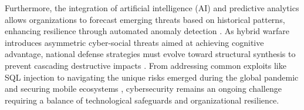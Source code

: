 \documentclass[11pt,a4paper]{article}
\begin{document}
Furthermore, the integration of artificial intelligence (AI) and predictive analytics allows organizations to forecast emerging threats based on historical patterns, enhancing resilience through automated anomaly detection \cite{b4, b6}. As hybrid warfare introduces asymmetric cyber-social threats aimed at achieving cognitive advantage, national defense strategies must evolve toward structural synthesis to prevent cascading destructive impacts \cite{b7}. From addressing common exploits like SQL injection \cite{b5} to navigating the unique risks emerged during the global pandemic \cite{b9} and securing mobile ecosystems \cite{b10}, cybersecurity remains an ongoing challenge requiring a balance of technological safeguards and organizational resilience.

\end{document}
